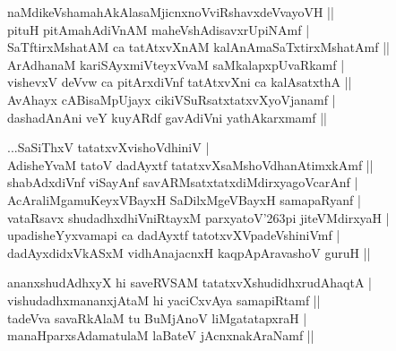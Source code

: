 \begin{entry}
\begin{shl}
naMdikeVshamahAkAlasaMjicnxnoVviRshavxdeVvayoVH ||\\
pituH pitAmahAdiVnAM maheVshAdisavxrUpiNAmf |\\
SaTftirxMshatAM ca tatAtxvXnAM kalAnAmaSaTxtirxMshatAmf ||\\
ArAdhanaM kariSAyxmiVteyxVvaM saMkalapxpUvaRkamf |\\
vishevxV deVvw ca pitArxdiVnf tatAtxvXni ca kalAsatxthA ||\\
AvAhayx cABisaMpUjayx cikiVSuRsatxtatxvXyoVjanamf |\\
dashadAnAni veY kuyARdf gavAdiVni yathAkarxmamf ||
\end{shl}
\medskip
{}
\end{entry}

\begin{entry}
\smallskip
\begin{shl}
...SaSiThxV tatatxvXvishoVdhiniV |\\
AdisheYvaM tatoV dadAyxtf tatatxvXsaMshoVdhanAtimxkAmf ||\\
shabAdxdiVnf viSayAnf savARMsatxtatxdiMdirxyagoVcarAnf |\\
AcAraliMgamuKeyxVBayxH SaDilxMgeVBayxH samapaRyanf |\\
vataRsavx shudadhxdhiVniRtayxM parxyatoV{\char'263}pi jiteVMdirxyaH |\\
upadisheYyxvamapi ca dadAyxtf tatotxvXVpadeVshiniVmf |\\
dadAyxdidxVkASxM vidhAnajacnxH kaqpApAravashoV guruH ||
\end{shl}
\medskip
{}
\end{entry}

\begin{entry}
\smallskip
\begin{shl}
ananxshudAdhxyX hi saveRVSAM tatatxvXshudidhxrudAhaqtA |\\
vishudadhxmananxjAtaM hi yaciCxvAya samapiRtamf ||\\
tadeVva savaRkAlaM tu BuMjAnoV liMgatatapxraH |\\
manaHparxsAdamatulaM laBateV jAcnxnakAraNamf ||
\end{shl}
\medskip
{}
\end{entry}

